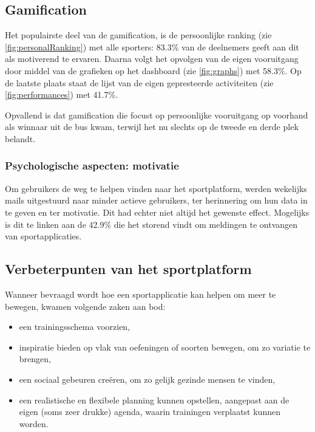 \subsection{Gamification}

Het populairste deel van de gamification, is de persoonlijke ranking (zie \ref{fig:personalRanking}) met alle sporters: 83.3\% van de deelnemers geeft aan dit als motiverend te ervaren.
Daarna volgt het opvolgen van de eigen vooruitgang door middel van de grafieken op het dashboard (zie \ref{fig:graphs}) met 58.3\%.
Op de laatste plaats staat de lijst van de eigen gepresteerde activiteiten (zie \ref{fig:performances}) met 41.7\%.

Opvallend is dat gamification die focust op persoonlijke vooruitgang op voorhand als winnaar uit de bus kwam, terwijl het nu slechts op de tweede en derde plek belandt.

\subsubsection{Psychologische aspecten: motivatie}

Om gebruikers de weg te helpen vinden naar het sportplatform, werden wekelijks mails uitgestuurd naar minder actieve gebruikers, ter herinnering om hun data in te geven en ter motivatie. Dit had echter niet altijd het gewenste effect.
Mogelijks is dit te linken aan de 42.9\% die het storend vindt om meldingen te ontvangen van sportapplicaties.

\subsection{Verbeterpunten van het sportplatform}
\label{ssec:verbeterpunten}

Wanneer bevraagd wordt hoe een sportapplicatie kan helpen om meer te bewegen, kwamen volgende zaken aan bod:

\begin{itemize}
    \item een trainingsschema voorzien,
    \item inspiratie bieden op vlak van oefeningen of soorten bewegen, om zo variatie te brengen,
    \item een sociaal gebeuren creëren, om zo gelijk gezinde mensen te vinden,
    \item een realistische en flexibele planning kunnen opstellen, aangepast aan de eigen (soms zeer drukke) agenda, waarin trainingen verplaatst kunnen worden.
\end{itemize}

